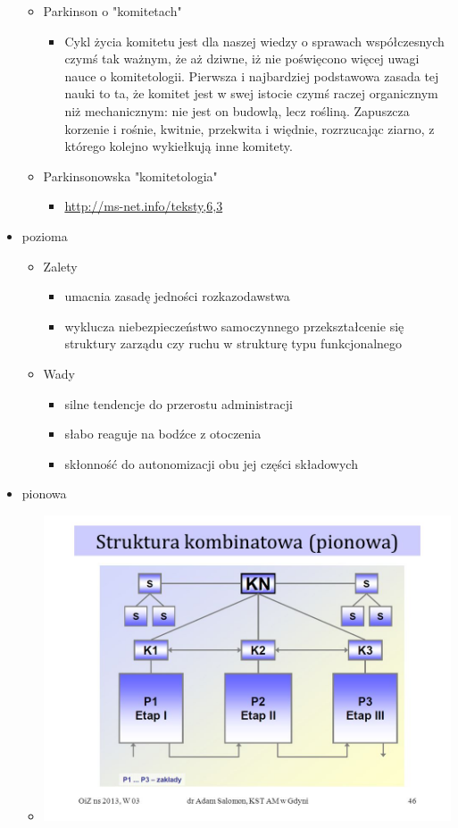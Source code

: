 \documentclass[a4paper,10pt]{report}
\begin{document}
\begin{itemize}
\begin{itemize}
		\item Parkinson o "komitetach"
		\begin{itemize}
			\item Cykl życia komitetu jest dla naszej wiedzy o sprawach współczesnych czymś tak ważnym, że aż dziwne, iż nie poświęcono więcej uwagi nauce o komitetologii. Pierwsza i najbardziej podstawowa zasada tej nauki to ta, że komitet jest w swej istocie czymś raczej organicznym niż mechanicznym: nie jest on budowlą, lecz rośliną. Zapuszcza korzenie i rośnie, kwitnie, przekwita i więdnie, rozrzucając ziarno, z którego kolejno wykiełkują inne komitety. 
		\end{itemize}
		\item Parkinsonowska "komitetologia"
		\begin{itemize}
			\item \url{http://ms-net.info/teksty,6,3}
		\end{itemize}
	\end{itemize}
	\item pozioma
	\begin{itemize}
		\item Zalety
		\begin{itemize}
			\item umacnia zasadę jedności rozkazodawstwa
			\item wyklucza niebezpieczeństwo samoczynnego przekształcenie się struktury zarządu czy ruchu w strukturę typu funkcjonalnego
		\end{itemize}
		\item Wady
		\begin{itemize}
			\item silne tendencje do przerostu administracji
			\item słabo reaguje na bodźce z otoczenia
			\item skłonność do autonomizacji obu jej części składowych
		\end{itemize}
	\end{itemize}
	\item pionowa
	\begin{itemize}
		\item \includegraphics[scale=0.42]{assets/str_pio}

\end{itemize}
\end{itemize}
\end{document}

